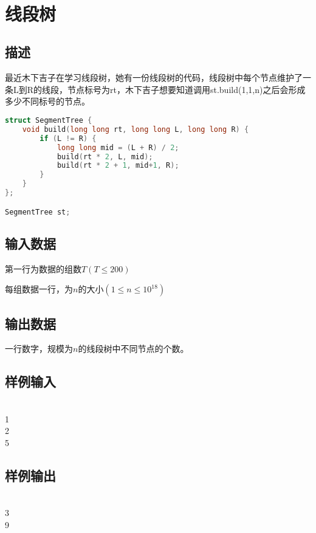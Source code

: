 \documentclass[UTF8]{ctexrep}
\begin{document}
\tt
{}
\fi


\section{线段树}
\subsection*{描述}
最近木下吉子在学习线段树，她有一份线段树的代码，线段树中每个节点维护了一条L到R的线段，节点标号为rt，木下吉子想要知道调用st.build(1,1,n)之后会形成多少不同标号的节点。
\begin{lstlisting}[language=C++]
struct SegmentTree {
	void build(long long rt, long long L, long long R) {
		if (L != R) {
			long long mid = (L + R) / 2;
			build(rt * 2, L, mid);
			build(rt * 2 + 1, mid+1, R);
		}
	}
};

SegmentTree st;
\end{lstlisting} 

\subsection*{输入数据}
第一行为数据的组数$T(T\leqslant 200)$

每组数据一行，为$n$的大小$(1\leqslant n\leqslant 10^{18})$

\subsection*{输出数据}
一行数字，规模为$n$的线段树中不同节点的个数。


\subsection*{样例输入}
\\
1\\
2\\
5


\subsection*{样例输出}
\\
3\\
9


\ifx\allfiles\undefined
\end{document}
